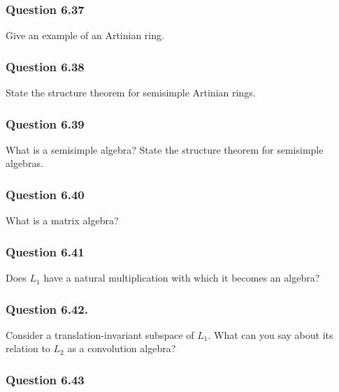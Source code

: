 \hypertarget{question-6.37}{%
\subsubsection{Question 6.37}\label{question-6.37}}

Give an example of an Artinian ring.

\hypertarget{question-6.38}{%
\subsubsection{Question 6.38}\label{question-6.38}}

State the structure theorem for semisimple Artinian rings.

\hypertarget{question-6.39}{%
\subsubsection{Question 6.39}\label{question-6.39}}

What is a semisimple algebra? State the structure theorem for semisimple
algebras.

\hypertarget{question-6.40}{%
\subsubsection{Question 6.40}\label{question-6.40}}

What is a matrix algebra?

\hypertarget{question-6.41}{%
\subsubsection{Question 6.41}\label{question-6.41}}

Does \(L_1\) have a natural multiplication with which it becomes an
algebra?

\hypertarget{question-6.42.}{%
\subsubsection{Question 6.42.}\label{question-6.42.}}

Consider a translation-invariant subspace of \(L_1\). What can you say
about its relation to \(L_2\) as a convolution algebra?

\hypertarget{question-6.43}{%
\subsubsection{Question 6.43}\label{question-6.43}}

